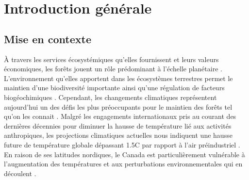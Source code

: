 \chapter*{Introduction générale}         %
\label{chap-introduction}       %


\section*{Mise en contexte}
\label{sec:contexte}
À travers les services écosystémiques qu'elles fournissent et leurs valeurs économiques, les forêts jouent un rôle prédominant à l'échelle planétaire \citep{Balvanera2006Quantifyingevidence}.
L'environnement qu'elles apportent dans les écosystèmes terrestres permet le maintien d’une biodiversité importante ainsi qu'une régulation de facteurs biogéochimiques \citep{Pawson2013Plantationforests}. 
Cependant, les changements climatiques représentent aujourd'hui un des défis les plus préoccupants pour le maintien des forêts tel qu'on les connait \citep{McKenney2009Climatechange,Trumbore2015Foresthealth,Seidl2017Forestdisturbances,Messier2022Warningnatural}.  
Malgré les engagements internationaux pris au courant des dernières décennies pour diminuer la hausse de température lié aux activités anthropiques, 
les projections climatiques actuelles nous indiquent une hausse future de température globale dépassant 1.5C par rapport à l'air préindustriel \citep{Matthews2022Currentglobal}.
En raison de ses latitudes nordiques, le Canada est particulièrement vulnérable à l'augmentation des températures et aux perturbations environnementales qui en découlent \citep{Alo2008Potentialfuture,Bush2019Canadachanging}. 

